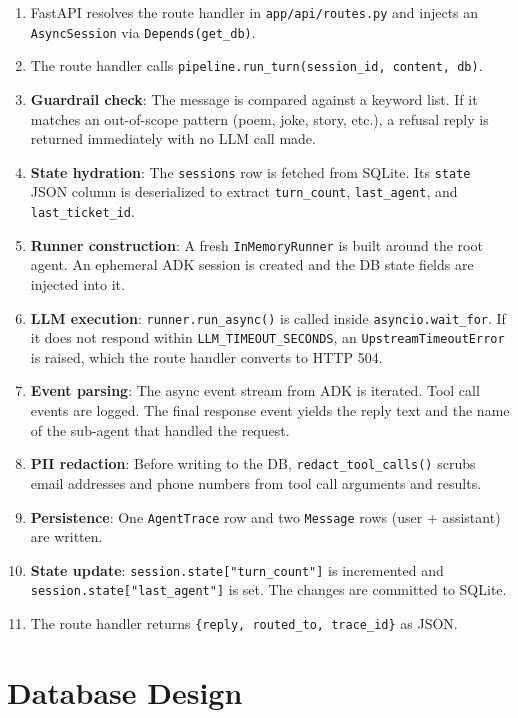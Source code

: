 \documentclass[12pt,a4paper]{article}
\begin{document}
\begin{enumerate}[leftmargin=1.5em]
  \item FastAPI resolves the route handler in \texttt{app/api/routes.py} and injects an \texttt{AsyncSession} via \texttt{Depends(get\_db)}.
  \item The route handler calls \texttt{pipeline.run\_turn(session\_id, content, db)}.
  \item \textbf{Guardrail check}: The message is compared against a keyword list. If it matches an out-of-scope pattern (poem, joke, story, etc.), a refusal reply is returned immediately with no LLM call made.
  \item \textbf{State hydration}: The \texttt{sessions} row is fetched from SQLite. Its \texttt{state} JSON column is deserialized to extract \texttt{turn\_count}, \texttt{last\_agent}, and \texttt{last\_ticket\_id}.
  \item \textbf{Runner construction}: A fresh \texttt{InMemoryRunner} is built around the root agent. An ephemeral ADK session is created and the DB state fields are injected into it.
  \item \textbf{LLM execution}: \texttt{runner.run\_async()} is called inside \texttt{asyncio.wait\_for}. If it does not respond within \texttt{LLM\_TIMEOUT\_SECONDS}, an \texttt{UpstreamTimeoutError} is raised, which the route handler converts to HTTP 504.
  \item \textbf{Event parsing}: The async event stream from ADK is iterated. Tool call events are logged. The final response event yields the reply text and the name of the sub-agent that handled the request.
  \item \textbf{PII redaction}: Before writing to the DB, \texttt{redact\_tool\_calls()} scrubs email addresses and phone numbers from tool call arguments and results.
  \item \textbf{Persistence}: One \texttt{AgentTrace} row and two \texttt{Message} rows (user + assistant) are written.
  \item \textbf{State update}: \texttt{session.state["turn\_count"]} is incremented and \texttt{session.state["last\_agent"]} is set. The changes are committed to SQLite.
  \item The route handler returns \texttt{\{reply, routed\_to, trace\_id\}} as JSON.
\end{enumerate}

\section{Database Design}
\end{document}
